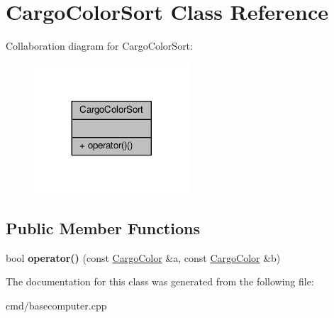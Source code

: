 \hypertarget{classCargoColorSort}{}\section{Cargo\+Color\+Sort Class Reference}
\label{classCargoColorSort}


Collaboration diagram for Cargo\+Color\+Sort\+:
\nopagebreak
\begin{figure}[H]
\begin{center}
\leavevmode
\includegraphics[width=164pt]{d9/dd5/classCargoColorSort__coll__graph}
\end{center}
\end{figure}
\subsection*{Public Member Functions}
\begin{DoxyCompactItemize}
\item 
bool {\bfseries operator()} (const \hyperlink{classCargoColor}{Cargo\+Color} \&a, const \hyperlink{classCargoColor}{Cargo\+Color} \&b)\hypertarget{classCargoColorSort_a7cc92a762083490184f7b1c40c1d4eb7}{}\label{classCargoColorSort_a7cc92a762083490184f7b1c40c1d4eb7}

\end{DoxyCompactItemize}


The documentation for this class was generated from the following file\+:\begin{DoxyCompactItemize}
\item 
cmd/basecomputer.\+cpp\end{DoxyCompactItemize}
